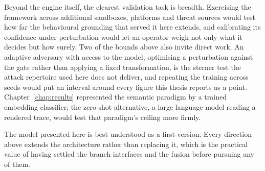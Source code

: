 \documentclass[%
    BCOR=10mm,
    DIV=13,
    toc=bibliography,
    toc=listof,
    oneside,
    12pt,
]{scrbook}
\begin{document}
Beyond the engine itself, the clearest validation task is breadth. Exercising
the framework across additional sandboxes, platforms and threat sources would
test how far the behavioural grounding that served it here extends, and
calibrating its confidence under perturbation would let an operator weigh not
only what it decides but how surely. Two of the bounds above also invite direct work.
An adaptive adversary with access to the model, optimising a perturbation against the
gate rather than applying a fixed transformation, is the sterner test the attack
repertoire used here does not deliver, and repeating the training across seeds would
put an interval around every figure this thesis reports as a point.
Chapter~\ref{chap:results} represented
the semantic paradigm by a trained embedding classifier; the zero-shot
alternative, a large language model reading a rendered trace, would test that
paradigm's ceiling more firmly.

The model presented here is best understood as a first version. Every direction
above extends the architecture rather than replacing it, which is the practical
value of having settled the branch interfaces and the fusion before pursuing any
of them.

\begingroup
{}
\let\oldthebibliography\thebibliography
\renewcommand{\thebibliography}[1]{%
  \oldthebibliography{#1}%
  \setlength{\itemsep}{7pt}%
  \setlength{\parskip}{0pt}%
}


\endgroup
\end{document}
